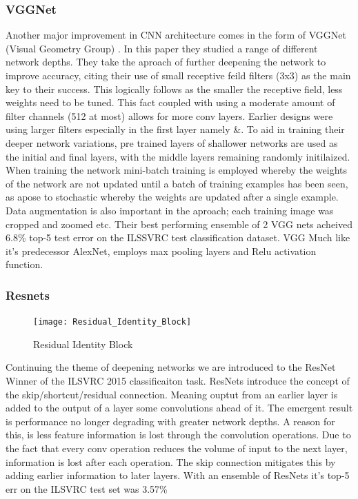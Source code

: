   \subsubsection{VGGNet}
    Another major improvement in CNN architecture comes in the form of VGGNet (Visual Geometry Group) \cite{Simonyan2015}. In this paper they studied a range of different network depths. They take the aproach of further deepening the network to improve accuracy, citing their use of small receptive feild filters (3x3) as the main key to their success. This logically follows as the smaller the receptive field, less weights need to be tuned. This fact coupled with using a moderate amount of filter channels (512 at most) allows for more conv layers. Earlier designs were using larger filters especially in the first layer namely \cite{Krizhevsky}\&\cite{Sermanet2013}. To aid in training their deeper network variations, pre trained layers of shallower networks are used as the initial and final layers, with the middle layers remaining randomly initilaized. When training the network mini-batch training is employed whereby the weights of the network are not updated until a batch of training examples has been seen, as apose to stochastic whereby the weights are updated after a single example. Data augmentation is also important in the aproach; each training image was cropped and zoomed etc. Their best performing ensemble of 2 VGG nets acheived 6.8\% top-5 test error on the ILSSVRC test classification dataset. VGG Much like it's predecessor AlexNet, employs max pooling layers and Relu activation function.
  \subsubsection{Resnets}
    \par
    \begin{figure}
      \centering
      \texttt{[image: Residual\_Identity\_Block]}
      \caption{\label{fig:resnet_id_block}Residual Identity Block}
    \end{figure}
    Continuing the theme of deepening networks we are introduced to the ResNet \cite{He} Winner of the ILSVRC 2015 classificaiton task. ResNets introduce the concept of the skip/shortcut/residual connection. Meaning ouptut from an earlier layer is added to the output of a layer some convolutions ahead of it. The emergent result is performance no longer degrading with greater network depths. A reason for this, is less feature information is lost through the convolution operations. Due to the fact that every conv operation reduces the volume of input to the next layer, information is lost after each operation. The skip connection mitigates this by adding earlier information to later layers. With an ensemble of ResNets it's top-5 err on the ILSVRC test set was 3.57\%
